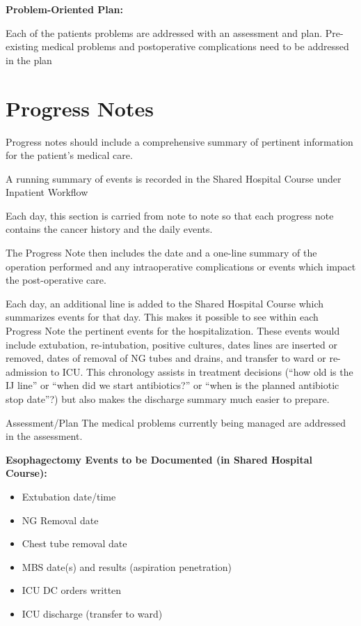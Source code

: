 \documentclass[
]{book}
\providecommand{\tightlist}{%
  \setlength{\itemsep}{0pt}\setlength{\parskip}{0pt}}
\begin{document}
\textbf{Problem-Oriented Plan:}

Each of the patients problems are addressed with an assessment and plan. Pre-existing medical problems and postoperative complications need to be addressed in the plan

\hypertarget{progress-notes}{%
\chapter{Progress Notes}\label{progress-notes}}

Progress notes should include a comprehensive summary of pertinent information for the patient's medical care.

A running summary of events is recorded in the Shared Hospital Course under Inpatient Workflow

Each day, this section is carried from note to note so that each progress note contains the cancer history and the daily events.

The Progress Note then includes the date and a one-line summary of the operation performed and any intraoperative complications or events which impact the post-operative care.

Each day, an additional line is added to the Shared Hospital Course which summarizes events for that day. This makes it possible to see within each Progress Note the pertinent events for the hospitalization. These events would include extubation, re-intubation, positive cultures, dates lines are inserted or removed, dates of removal of NG tubes and drains, and transfer to ward or re-admission to ICU. This chronology assists in treatment decisions (``how old is the IJ line'' or ``when did we start antibiotics?'' or ``when is the planned antibiotic stop date''?) but also makes the discharge summary much easier to prepare.

Assessment/Plan
The medical problems currently being managed are addressed in the assessment.

\textbf{Esophagectomy Events to be Documented (in Shared Hospital Course):}

\begin{itemize}
\tightlist
\item
  Extubation date/time
\item
  NG Removal date
\item
  Chest tube removal date
\item
  MBS date(s) and results (aspiration \textbar{} penetration)
\item
  ICU DC orders written
\item
  ICU discharge (transfer to ward)
\end{itemize}
\end{document}
